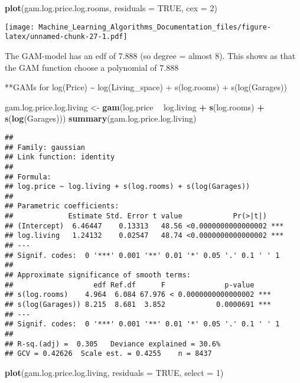 \documentclass[
]{article}
\newenvironment{Shaded}{\begin{snugshade}}{\end{snugshade}}
\newcommand{\DataTypeTok}[1]{\textcolor[rgb]{0.13,0.29,0.53}{#1}}
\newcommand{\DecValTok}[1]{\textcolor[rgb]{0.00,0.00,0.81}{#1}}
\newcommand{\KeywordTok}[1]{\textcolor[rgb]{0.13,0.29,0.53}{\textbf{#1}}}
\newcommand{\NormalTok}[1]{#1}
\newcommand{\OperatorTok}[1]{\textcolor[rgb]{0.81,0.36,0.00}{\textbf{#1}}}
\newcommand{\OtherTok}[1]{\textcolor[rgb]{0.56,0.35,0.01}{#1}}
\newcommand{\StringTok}[1]{\textcolor[rgb]{0.31,0.60,0.02}{#1}}
\begin{document}
\begin{Shaded}
\begin{Highlighting}[]
\KeywordTok{plot}\NormalTok{(gam.log.price.log.rooms, }\DataTypeTok{residuals =} \OtherTok{TRUE}\NormalTok{, }\DataTypeTok{cex =} \DecValTok{2}\NormalTok{)}
\end{Highlighting}
\end{Shaded}

\texttt{[image: Machine\_Learning\_Algorithms\_Documentation\_files/figure-latex/unnamed-chunk-27-1.pdf]}

The GAM-model has an edf of 7.888 (so degree = almost 8). This shows as
that the GAM function choose a polynomial of 7.888

**GAMs for log(Price) \textasciitilde{} log(Living\_space) +
s(log.rooms) + s(log(Garages))

\begin{Shaded}
\begin{Highlighting}[]
\NormalTok{gam.log.price.log.living <-}\StringTok{ }\KeywordTok{gam}\NormalTok{(log.price }\OperatorTok{~}\StringTok{ }\NormalTok{log.living }\OperatorTok{+}\StringTok{ }\KeywordTok{s}\NormalTok{(log.rooms) }\OperatorTok{+}\StringTok{ }\KeywordTok{s}\NormalTok{(}\KeywordTok{log}\NormalTok{(Garages)))}
\KeywordTok{summary}\NormalTok{(gam.log.price.log.living)}
\end{Highlighting}
\end{Shaded}

\begin{verbatim}
## 
## Family: gaussian 
## Link function: identity 
## 
## Formula:
## log.price ~ log.living + s(log.rooms) + s(log(Garages))
## 
## Parametric coefficients:
##             Estimate Std. Error t value            Pr(>|t|)    
## (Intercept)  6.46447    0.13313   48.56 <0.0000000000000002 ***
## log.living   1.24132    0.02547   48.74 <0.0000000000000002 ***
## ---
## Signif. codes:  0 '***' 0.001 '**' 0.01 '*' 0.05 '.' 0.1 ' ' 1
## 
## Approximate significance of smooth terms:
##                   edf Ref.df      F              p-value    
## s(log.rooms)    4.964  6.084 67.976 < 0.0000000000000002 ***
## s(log(Garages)) 8.215  8.681  3.852            0.0000691 ***
## ---
## Signif. codes:  0 '***' 0.001 '**' 0.01 '*' 0.05 '.' 0.1 ' ' 1
## 
## R-sq.(adj) =  0.305   Deviance explained = 30.6%
## GCV = 0.42626  Scale est. = 0.4255    n = 8437
\end{verbatim}

\begin{Shaded}
\begin{Highlighting}[]
\KeywordTok{plot}\NormalTok{(gam.log.price.log.living, }\DataTypeTok{residuals =} \OtherTok{TRUE}\NormalTok{, }\DataTypeTok{select =} \DecValTok{1}\NormalTok{)}
\end{Highlighting}
\end{Shaded}
\end{document}
